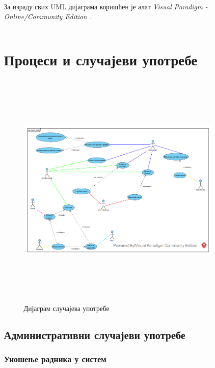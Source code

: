 \documentclass{article}
\begin{document}
За израду свих UML дијаграма
коришћен је алат 
\textit{Visual Paradigm - Online/Community Edition} \cite{vs}.\\\\

\section{Процеси и случајеви употребе}

\begin{figure}[H]
\centering
\includegraphics[width=0.9\textwidth, height=12cm]{Dijagrami_slike/uc_diagram.png}
\caption{\label{fig:uc_diagram}Дијаграм случајева употребе}
\end{figure}

\subsection{Административни случајеви употребе}

\subsubsection{Уношење радника у систем}
\end{document}
